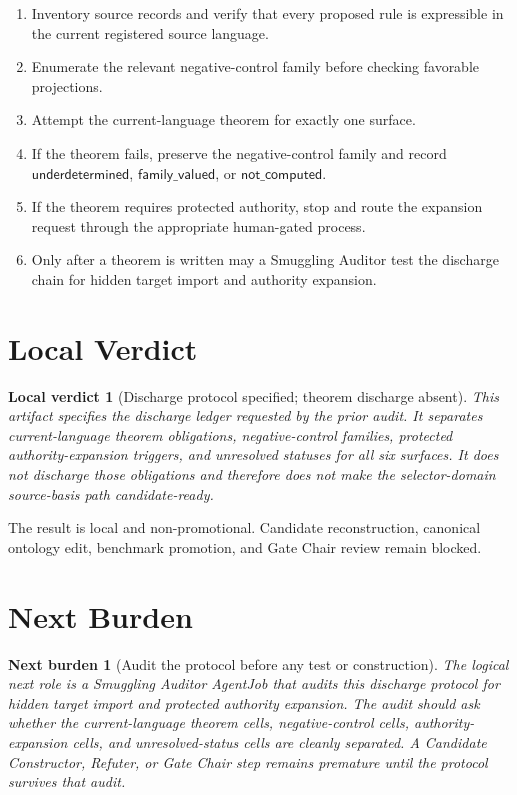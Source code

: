 \documentclass[11pt]{article}
\newtheorem{localverdict}{Local verdict}
\newtheorem{nextburden}{Next burden}
\begin{document}
\begin{enumerate}
    \item Inventory source records and verify that every proposed rule is
    expressible in the current registered source language.
    \item Enumerate the relevant negative-control family before checking
    favorable projections.
    \item Attempt the current-language theorem for exactly one surface.
    \item If the theorem fails, preserve the negative-control family and
    record \(\mathsf{underdetermined}\), \(\mathsf{family\_valued}\), or
    \(\mathsf{not\_computed}\).
    \item If the theorem requires protected authority, stop and route the
    expansion request through the appropriate human-gated process.
    \item Only after a theorem is written may a Smuggling Auditor test the
    discharge chain for hidden target import and authority expansion.
\end{enumerate}

\section{Local Verdict}

\begin{localverdict}[Discharge protocol specified; theorem discharge absent]
This artifact specifies the discharge ledger requested by the prior audit.
It separates current-language theorem obligations, negative-control families,
protected authority-expansion triggers, and unresolved statuses for all six
surfaces. It does not discharge those obligations and therefore does not make
the selector-domain source-basis path candidate-ready.
\end{localverdict}

The result is local and non-promotional. Candidate reconstruction, canonical
ontology edit, benchmark promotion, and Gate Chair review remain blocked.

\section{Next Burden}

\begin{nextburden}[Audit the protocol before any test or construction]
The logical next role is a Smuggling Auditor AgentJob that audits this
discharge protocol for hidden target import and protected authority
expansion. The audit should ask whether the current-language theorem cells,
negative-control cells, authority-expansion cells, and unresolved-status
cells are cleanly separated. A Candidate Constructor, Refuter, or Gate Chair
step remains premature until the protocol survives that audit.
\end{nextburden}
\end{document}
